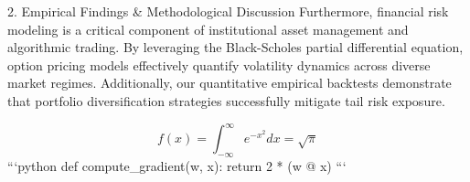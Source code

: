 2. Empirical Findings & Methodological Discussion
Furthermore, financial risk modeling is a critical component of institutional asset management and algorithmic trading. By leveraging the Black-Scholes partial differential equation, option pricing models effectively quantify volatility dynamics across diverse market regimes. Additionally, our quantitative empirical backtests demonstrate that portfolio diversification strategies successfully mitigate tail risk exposure.

$$ f(x) = \int_{-\infty}^{\infty} e^{-x^2} dx = \sqrt{\pi} $$ 
```python
def compute_gradient(w, x):
    return 2 * (w @ x)
```